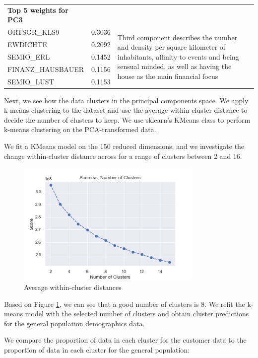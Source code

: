 \begin{tabular}{lll}
    \textbf{Top 5 weights for PC3} \\
    ORTSGR\_KLS9 & 0.3036 & \multirow{5}{30em}{Third component describes the number and density per square kilometer of inhabitants, affinity to events and being sensual minded, as well as having the house as the main financial focus} \\
    EWDICHTE & 0.2092 \\
    SEMIO\_ERL & 0.1452 \\
    FINANZ\_HAUSBAUER & 0.1156 \\
    SEMIO\_LUST & 0.1153 \\
\end{tabular}

Next, we see how the data clusters in the principal components space. We apply k-means clustering to the dataset and use the average within-cluster distance to decide the number of clusters to keep. We use sklearn's KMeans class to perform k-means clustering on the PCA-transformed data.
 
We fit a KMeans model on the 150 reduced dimensions, and we investigate the change within-cluster distance across for a range of clusters between 2 and 16.

\begin{figure}[h]
\centering
\includegraphics[width=0.8\textwidth]{images/kmeans.png}
\caption{Average within-cluster distances}
\label{fig:kmeans}
\end{figure}

Based on Figure \ref{fig:kmeans}, we can see that a good number of clusters is 8. We refit the k-means model with the selected number of clusters and obtain cluster predictions for the general population demographics data.

We compare the proportion of data in each cluster for the customer data to the proportion of data in each cluster for the general population:

